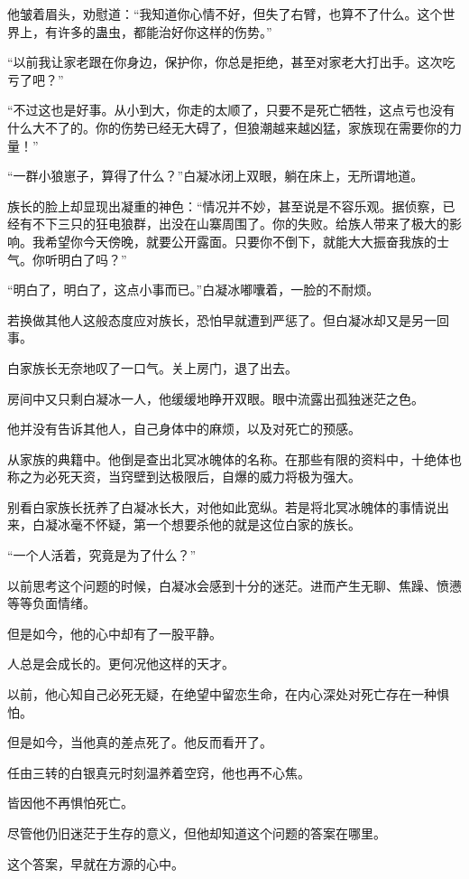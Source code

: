 \begin{this_body}
他皱着眉头，劝慰道：“我知道你心情不好，但失了右臂，也算不了什么。这个世界上，有许多的蛊虫，都能治好你这样的伤势。”

“以前我让家老跟在你身边，保护你，你总是拒绝，甚至对家老大打出手。这次吃亏了吧？”

“不过这也是好事。从小到大，你走的太顺了，只要不是死亡牺牲，这点亏也没有什么大不了的。你的伤势已经无大碍了，但狼潮越来越凶猛，家族现在需要你的力量！”

“一群小狼崽子，算得了什么？”白凝冰闭上双眼，躺在床上，无所谓地道。

族长的脸上却显现出凝重的神色：“情况并不妙，甚至说是不容乐观。据侦察，已经有不下三只的狂电狼群，出没在山寨周围了。你的失败。给族人带来了极大的影响。我希望你今天傍晚，就要公开露面。只要你不倒下，就能大大振奋我族的士气。你听明白了吗？”

“明白了，明白了，这点小事而已。”白凝冰嘟囔着，一脸的不耐烦。

若换做其他人这般态度应对族长，恐怕早就遭到严惩了。但白凝冰却又是另一回事。

白家族长无奈地叹了一口气。关上房门，退了出去。

房间中又只剩白凝冰一人，他缓缓地睁开双眼。眼中流露出孤独迷茫之色。

他并没有告诉其他人，自己身体中的麻烦，以及对死亡的预感。

从家族的典籍中。他倒是查出北冥冰魄体的名称。在那些有限的资料中，十绝体也称之为必死天资，当窍壁到达极限后，自爆的威力将极为强大。

别看白家族长抚养了白凝冰长大，对他如此宽纵。若是将北冥冰魄体的事情说出来，白凝冰毫不怀疑，第一个想要杀他的就是这位白家的族长。

“一个人活着，究竟是为了什么？”

以前思考这个问题的时候，白凝冰会感到十分的迷茫。进而产生无聊、焦躁、愤懑等等负面情绪。

但是如今，他的心中却有了一股平静。

人总是会成长的。更何况他这样的天才。

以前，他心知自己必死无疑，在绝望中留恋生命，在内心深处对死亡存在一种惧怕。

但是如今，当他真的差点死了。他反而看开了。

任由三转的白银真元时刻温养着空窍，他也再不心焦。

皆因他不再惧怕死亡。

尽管他仍旧迷茫于生存的意义，但他却知道这个问题的答案在哪里。

这个答案，早就在方源的心中。


\end{this_body}
